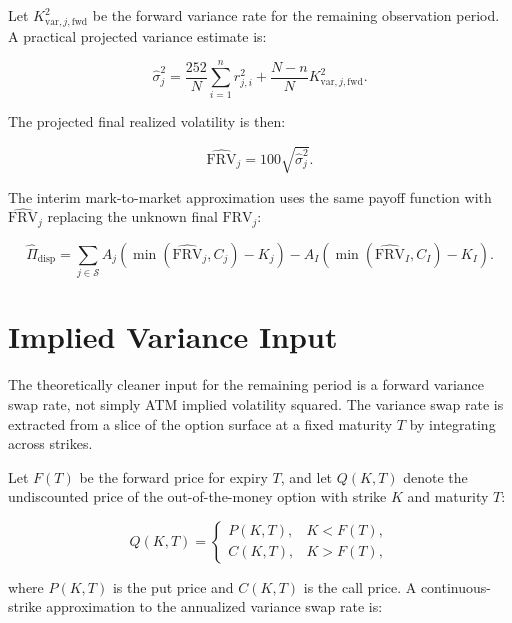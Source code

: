 \documentclass[11pt]{article}
\begin{document}
Let $K_{\mathrm{var},j,\mathrm{fwd}}^2$ be the forward variance rate for the remaining observation period. A practical projected variance estimate is:

\begin{equation}
    \widehat{\sigma}_{j}^{2}
    =
    \frac{252}{N}
    \sum_{i=1}^{n} r_{j,i}^{2}
    +
    \frac{N-n}{N}
    K_{\mathrm{var},j,\mathrm{fwd}}^2 .
\end{equation}

The projected final realized volatility is then:

\begin{equation}
    \widehat{\mathrm{FRV}}_j
    =
    100 \sqrt{\widehat{\sigma}_{j}^{2}} .
\end{equation}

The interim mark-to-market approximation uses the same payoff function with $\widehat{\mathrm{FRV}}_j$ replacing the unknown final $\mathrm{FRV}_j$:

\begin{equation}
    \widehat{\Pi}_{\mathrm{disp}}
    =
    \sum_{j \in \mathcal{S}}
    A_j
    \left(
        \min(\widehat{\mathrm{FRV}}_j, C_j) - K_j
    \right)
    -
    A_I
    \left(
        \min(\widehat{\mathrm{FRV}}_I, C_I) - K_I
    \right).
\end{equation}

\section{Implied Variance Input}

The theoretically cleaner input for the remaining period is a forward variance swap rate, not simply ATM implied volatility squared. The variance swap rate is extracted from a slice of the option surface at a fixed maturity $T$ by integrating across strikes.

Let $F(T)$ be the forward price for expiry $T$, and let $Q(K,T)$ denote the undiscounted price of the out-of-the-money option with strike $K$ and maturity $T$:

\begin{equation}
    Q(K,T)
    =
    \begin{cases}
        P(K,T), & K < F(T), \\
        C(K,T), & K > F(T),
    \end{cases}
\end{equation}

where $P(K,T)$ is the put price and $C(K,T)$ is the call price. A continuous-strike approximation to the annualized variance swap rate is:
\end{document}
